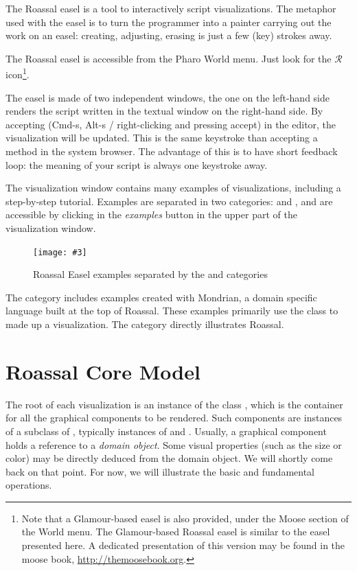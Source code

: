 \documentclass[a4paper,10pt,twoside]{book}
\newcommand{\fig}[4]{
		\begin{figure}[#1]
			\centering
			\texttt{[image: \#3]}
			\caption{\label{fig:#3}#4}
		\end{figure}}
\begin{document}
The Roassal easel is a tool to interactively script visualizations. The metaphor used with the easel is to turn the programmer into a painter carrying out the work on an easel: creating, adjusting, erasing is just a few (key) strokes away.

The Roassal easel is accessible from the Pharo World menu. Just look for the {\color{red} $\mathcal{R}$} icon\footnote{Note that a Glamour-based easel is also provided, under the Moose section of the World menu. The Glamour-based Roassal easel is similar to the easel presented here. A dedicated presentation of this version may be found in the moose book, \url{http://themoosebook.org}.}.

The easel is made of two independent windows, the one on the left-hand side renders the script written in the textual window on the right-hand side. By accepting (Cmd-s, Alt-s / right-clicking and pressing accept) in the editor, the visualization will be updated. This is the same keystroke than accepting a method in the system browser. The advantage of this is to have short feedback loop: the meaning of your script is always one keystroke away.

The visualization window contains many examples of visualizations, including a step-by-step tutorial. Examples are separated in two categories:  and , and are accessible by clicking in the \textit{examples} button in the upper part of the visualization window.

\fig{H}{0.8}{ROEasel}{Roassal Easel examples separated by the \ct{ROMondrianViewBuilder} and \ct{ROExample} categories}


The  category includes examples created with Mondrian, a domain specific language built at the top of Roassal. These examples primarily use the  class to made up a visualization. The   category directly illustrates Roassal.


\section{Roassal Core Model}

The root of each visualization is an instance of the class , which is the container for all the graphical components to be rendered.
Such components are instances of a subclass of , typically instances of  and . Usually, a graphical component holds a reference to a \emph{domain object}. Some visual properties (such as the size or color) may be directly deduced from the domain object. We will shortly come back on that point. For now, we will illustrate the basic and fundamental operations.
\end{document}
